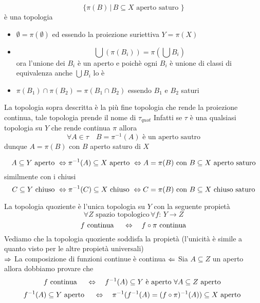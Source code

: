 \begin{prop}$$ \{ \pi(B) \, \vert \, B \subseteq X \text{ aperto saturo }\}$$ 
\`e una topologia
\proof \bbianco 
\begin{itemize}
\item $\emptyset = \pi(\emptyset)$ ed essendo la proiezione  suriettiva $Y=\pi(X)$
\item 
$$ \bigcup (\pi(B_i))=\pi \left( \bigcup B_i \right) $$
ora l'unione dei $B_i$ \`e un aperto e poich\`e ogni $B_i$ \`e unione di classi di equivalenza anche $\bigcup B_i$ lo \`e
\item $\pi (B_1) \cap \pi(B_2)=\pi(B_1\cap B_2)$ essendo $B_1$ e $B_2$ saturi
\end{itemize}
\endproof
\end{prop}
\begin{prop}La topologia sopra descritta \`e la pi\`u fine topologia che rende la proiezione continua, tale topologia prende il nome di $\tau_{quot}$
\proof Infatti se $\tau$ \`e una qualsiasi topologia su $Y$ che rende continua $\pi$ allora
$$ \forall A \in \tau \quad B = \pi^{-1}(A) \text{ \`e un aperto sautro}$$
dunque $A= \pi(B)$ con $B$ aperto saturo di $X$
\endproof
\end{prop}
\begin{oss}
$$ A \subseteq Y \text{ aperto } \Leftrightarrow \pi^{-1}(A) \subseteq X\text{ aperto } \Leftrightarrow A = \pi(B) \text{ con } B \subseteq X \text{ aperto saturo}$$
similmente con i chiusi
$$ C \subseteq Y \text{ chiuso } \Leftrightarrow \pi^{-1}(C) \subseteq X\text{ chiuso }\Leftrightarrow C = \pi(B) \text{ con } B \subseteq X \text{ chiuso saturo}$$
\end{oss}
\newpage
\begin{prop}\bianco
La topologia quoziente \`e l'unica topologia su $Y$ con la seguente propiet\`a
$$ \forall Z\text{ spazio topologico} \, \forall f:\, Y \to Z $$
$$ f\text{ continua } \quad \Leftrightarrow \quad f \circ \pi \text{ continua}$$
\proof Vediamo che la topologia quoziente soddisfa la propiet\`a (l'unicit\`a \`e simile a quanto visto per le altre propiet\`a universali)\\
$\Rightarrow$ La composizione di funzioni continue \`e continua
$\Leftarrow$ Sia $A \subseteq Z$ un aperto allora dobbiamo provare che 
$$ f \text{ continua } \quad \Leftrightarrow \quad f^{-1}(A)\subseteq  Y \text{ \`e aperto } \forall A\subseteq Z \text{ aperto }  $$
$$ f^{-1}(A) \subseteq Y \text{ aperto } \quad \Leftrightarrow \quad \pi^{-1} (f^{-1}(A)=(f\circ \pi)^{-1}(A))\subseteq X \text{ aperto } $$
\endproof
\end{prop}

